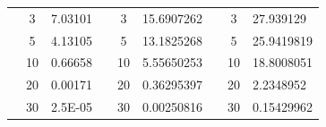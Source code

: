 \begin{table}[]
\begin{tabular}{|cclcclccl|}
\rowcolor[HTML]{DAE8FC} 
\multicolumn{1}{|c|}{\cellcolor[HTML]{FFFFC7}}                                & \multicolumn{1}{c|}{\cellcolor[HTML]{DAE8FC}3}         & \multicolumn{1}{l|}{\cellcolor[HTML]{DAE8FC}7.03101}    & \multicolumn{1}{c|}{\cellcolor[HTML]{FFFFC7}}                                & \multicolumn{1}{c|}{\cellcolor[HTML]{DAE8FC}3}         & \multicolumn{1}{l|}{\cellcolor[HTML]{DAE8FC}15.6907262} & \multicolumn{1}{c|}{\cellcolor[HTML]{FFFFC7}}                                & \multicolumn{1}{c|}{\cellcolor[HTML]{DAE8FC}3}         & 27.939129  \\ \cline{2-3} \cline{5-6} \cline{8-9} 
\rowcolor[HTML]{DDFDFF} 
\multicolumn{1}{|c|}{\cellcolor[HTML]{FFFFC7}}                                & \multicolumn{1}{c|}{\cellcolor[HTML]{DDFDFF}5}         & \multicolumn{1}{l|}{\cellcolor[HTML]{DDFDFF}4.13105}    & \multicolumn{1}{c|}{\cellcolor[HTML]{FFFFC7}}                                & \multicolumn{1}{c|}{\cellcolor[HTML]{DDFDFF}5}         & \multicolumn{1}{l|}{\cellcolor[HTML]{DDFDFF}13.1825268} & \multicolumn{1}{c|}{\cellcolor[HTML]{FFFFC7}}                                & \multicolumn{1}{c|}{\cellcolor[HTML]{DDFDFF}5}         & 25.9419819 \\ \cline{2-3} \cline{5-6} \cline{8-9} 
\rowcolor[HTML]{DAE8FC} 
\multicolumn{1}{|c|}{\cellcolor[HTML]{FFFFC7}}                                & \multicolumn{1}{c|}{\cellcolor[HTML]{DAE8FC}10}        & \multicolumn{1}{l|}{\cellcolor[HTML]{DAE8FC}0.66658}    & \multicolumn{1}{c|}{\cellcolor[HTML]{FFFFC7}}                                & \multicolumn{1}{c|}{\cellcolor[HTML]{DAE8FC}10}        & \multicolumn{1}{l|}{\cellcolor[HTML]{DAE8FC}5.55650253} & \multicolumn{1}{c|}{\cellcolor[HTML]{FFFFC7}}                                & \multicolumn{1}{c|}{\cellcolor[HTML]{DAE8FC}10}        & 18.8008051 \\ \cline{2-3} \cline{5-6} \cline{8-9} 
\rowcolor[HTML]{DDFDFF} 
\multicolumn{1}{|c|}{\cellcolor[HTML]{FFFFC7}}                                & \multicolumn{1}{c|}{\cellcolor[HTML]{DDFDFF}20}        & \multicolumn{1}{l|}{\cellcolor[HTML]{DDFDFF}0.00171}    & \multicolumn{1}{c|}{\cellcolor[HTML]{FFFFC7}}                                & \multicolumn{1}{c|}{\cellcolor[HTML]{DDFDFF}20}        & \multicolumn{1}{l|}{\cellcolor[HTML]{DDFDFF}0.36295397} & \multicolumn{1}{c|}{\cellcolor[HTML]{FFFFC7}}                                & \multicolumn{1}{c|}{\cellcolor[HTML]{DDFDFF}20}        & 2.2348952  \\ \cline{2-3} \cline{5-6} \cline{8-9} 
\rowcolor[HTML]{DAE8FC} 
\multicolumn{1}{|c|}{\cellcolor[HTML]{FFFFC7}}                                & \multicolumn{1}{c|}{\cellcolor[HTML]{DAE8FC}30}        & \multicolumn{1}{l|}{\cellcolor[HTML]{DAE8FC}2.5E-05}    & \multicolumn{1}{c|}{\cellcolor[HTML]{FFFFC7}}                                & \multicolumn{1}{c|}{\cellcolor[HTML]{DAE8FC}30}        & \multicolumn{1}{l|}{\cellcolor[HTML]{DAE8FC}0.00250816} & \multicolumn{1}{c|}{\cellcolor[HTML]{FFFFC7}}                                & \multicolumn{1}{c|}{\cellcolor[HTML]{DAE8FC}30}        & 0.15429962 \\ \cline{2-3} \cline{5-6} \cline{8-9} 

\end{tabular}
\end{table}
